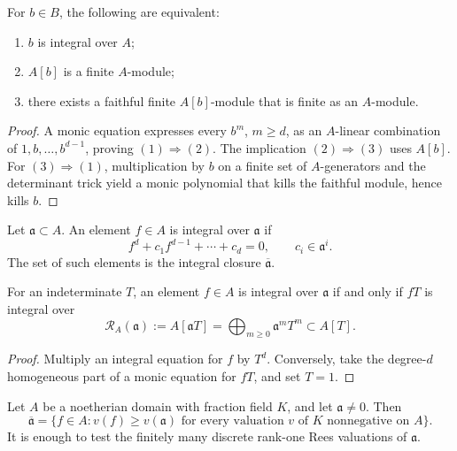 \begin{proposition}\label{prop:appA-finite-module-criterion}
For \(b\in B\), the following are equivalent:
\begin{enumerate}
\item \(b\) is integral over \(A\);
\item \(A[b]\) is a finite \(A\)-module;
\item there exists a faithful finite \(A[b]\)-module that is finite as an
      \(A\)-module.
\end{enumerate}
\par
\end{proposition}

\begin{proof}
A monic equation expresses every \(b^m\), \(m\geq d\), as an
\(A\)-linear combination of \(1,b,\ldots,b^{d-1}\), proving
\((1)\Rightarrow(2)\).  The implication \((2)\Rightarrow(3)\) uses
\(A[b]\).  For \((3)\Rightarrow(1)\), multiplication by \(b\) on a finite
set of \(A\)-generators and the determinant trick yield a monic polynomial
that kills the faithful module, hence kills \(b\).
\end{proof}

\begin{definition}
\label{def:appA-integral-closure-ideal}
Let \(\mathfrak a\subset A\).  An element \(f\in A\) is integral over
\(\mathfrak a\) if
\[
 f^d+c_1f^{d-1}+\cdots+c_d=0,
 \qquad c_i\in\mathfrak a^i.
\]
The set of such elements is the integral closure
\(\overline{\mathfrak a}\).
\end{definition}

\begin{lemma}\label{lem:appA-rees-translation}
For an indeterminate \(T\), an element \(f\in A\) is integral over
\(\mathfrak a\) if and only if \(fT\) is integral over
\[
 \mathcal R_A(\mathfrak a)
   :=A[\mathfrak aT]
   =\bigoplus_{m\geq0}\mathfrak a^mT^m
   \subset A[T].
\]
\end{lemma}

\begin{proof}
Multiply an integral equation for \(f\) by \(T^d\).  Conversely, take the
degree-\(d\) homogeneous part of a monic equation for \(fT\), and set
\(T=1\).
\end{proof}

\begin{theorem}\label{thm:appA-valuative-integral-closure}
Let \(A\) be a noetherian domain with fraction field \(K\), and let
\(\mathfrak a\ne0\).  Then
\[
 \overline{\mathfrak a}
   =\{f\in A:v(f)\geq v(\mathfrak a)
       \text{ for every valuation }v\text{ of }K
       \text{ nonnegative on }A\}.
\tag{A.2}\label{eq:appA-valuative-integral-closure}
\]
It is enough to test the finitely many discrete rank-one Rees valuations of
\(\mathfrak a\).
\end{theorem}

